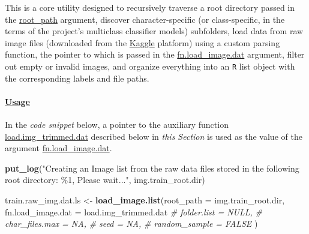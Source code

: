 \documentclass[
]{report}
\newenvironment{Shaded}{\begin{snugshade}}{\end{snugshade}}
\newcommand{\AttributeTok}[1]{\textcolor[rgb]{0.13,0.29,0.53}{#1}}
\newcommand{\CommentTok}[1]{\textcolor[rgb]{0.56,0.35,0.01}{\textit{#1}}}
\newcommand{\FunctionTok}[1]{\textcolor[rgb]{0.13,0.29,0.53}{\textbf{#1}}}
\newcommand{\NormalTok}[1]{#1}
\newcommand{\OtherTok}[1]{\textcolor[rgb]{0.56,0.35,0.01}{#1}}
\newcommand{\StringTok}[1]{\textcolor[rgb]{0.31,0.60,0.02}{#1}}
\begin{document}
\hfill\break

This is a core utility designed to recursively traverse a root directory passed in the \hyperref[func.load_image.list.args.root_path]{root\_path} argument, discover character-specific (or class-specific, in the terms of the project's multiclass classifier models) subfolders, load data from raw image files (downloaded from the \href{https://www.kaggle.com/datasets/vaibhao/handwritten-characters}{Kaggle} platform) using a custom parsing function, the pointer to which is passed in the \hyperref[func.load_image.list.args.fn.load_image.dat]{fn.load\_image.dat} argument, filter out empty or invalid images, and organize everything into an \texttt{R} list object with the corresponding labels and file paths.

\protect{}\label{func.load_image.list.usage}
\paragraph{\texorpdfstring{\href{https://github.com/AzKurban-edX-DS/edx.capstone.choose-your-own/blob/main/r/support-scripts/ds.train2trimmed_img.dat.R\#L12}{Usage}}{Usage}}\label{usage-1}

\hfill\break

\begin{noteblock}
In the \emph{code snippet} below, a pointer to the auxiliary function \hyperref[func.load.img_trimmed.dat]{load.img\_trimmed.dat} described below in \emph{this Section} is used as the value of the argument \hyperref[func.load_image.list.args.fn.load_image.dat]{fn.load\_image.dat}.

\end{noteblock}

\begin{Shaded}
\begin{Highlighting}[]
  \FunctionTok{put\_log}\NormalTok{(}\StringTok{"Creating an Image list from the raw data files }
\StringTok{stored in the following root directory: \%1,}
\StringTok{Please wait..."}\NormalTok{, img.train\_root.dir)}

\NormalTok{  train.raw\_img.dat.ls }\OtherTok{\textless{}{-}} \FunctionTok{load\_image.list}\NormalTok{(}\AttributeTok{root\_path =}\NormalTok{ img.train\_root.dir,}
                                        \AttributeTok{fn.load\_image.dat =}\NormalTok{ load.img\_trimmed.dat}
                                        \CommentTok{\# folder.list = NULL,}
                                        \CommentTok{\# char\_files.max = NA,}
                                        \CommentTok{\# seed = NA,}
                                        \CommentTok{\# random\_sample = FALSE}
\NormalTok{                                        )}
\end{Highlighting}
\end{Shaded}
\end{document}
